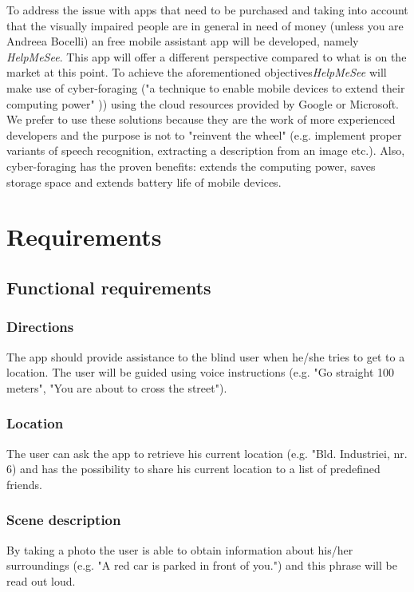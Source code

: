 \documentclass{article}[11]
\begin{document}
	To address the issue with apps that need to be purchased and taking into account that the visually impaired people are in general in need of money (unless you are Andreea Bocelli) an free mobile assistant app will be developed, namely \emph{HelpMeSee}. This app  will offer a different perspective compared to what is on the market at this point. To achieve the aforementioned objectives\emph{HelpMeSee} will make use of cyber-foraging ("a technique to enable mobile devices to extend their computing power" \cite{lewis2016decision})) using the cloud resources provided by Google or Microsoft. We prefer to use these solutions because they are the work of more experienced developers and the purpose is not to  "reinvent the wheel" (e.g. implement proper variants of speech recognition, extracting a description from an image etc.). Also, cyber-foraging has the proven benefits: extends the computing power, saves storage space and extends battery life of mobile devices.

	
	\newpage

\section{Requirements}

\subsection{Functional requirements}

\subsubsection{Directions}
	The app should provide assistance to the blind user when he/she tries to get to a location. The user will be guided using voice instructions (e.g. "Go straight 100 meters", "You are about to cross the street").
	
\subsubsection{Location}
	The user can ask the app to retrieve his current location (e.g. "Bld. Industriei, nr. 6) and has the possibility to share his current location to a list of predefined friends.
	
\subsubsection{Scene description}
	By taking a photo the user is able to obtain information about his/her surroundings (e.g. "A red car is parked in front of you.") and this phrase will be read out loud.
	
\end{document}
